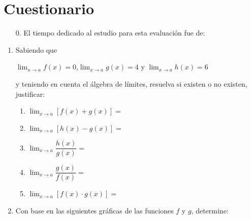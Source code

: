 \documentclass[letterpaper,fleqn]{article}
\let\ds\displaystyle
\begin{document}
 \section*{Cuestionario}
 \begin{enumerate}
 \item[0.] El tiempo dedicado al estudio para esta evaluación fue de: \hrulefill
 \end{enumerate}
\begin{enumerate}
 \item Sabiendo que
\begin{center}
$\ds{\lim_{x\rightarrow a}f(x)=0}$,\quad  $\ds{\lim_{x\rightarrow a}g(x)=4}$ \quad y \quad $\ds{\lim_{x\rightarrow a}h(x)=6}$ 
\end{center}
y teniendo en cuenta el álgebra de límites, resuelva si existen o no existen, justificar:
      \begin{enumerate}
	 \item $\ds{\lim_{x\rightarrow a}[f(x)+g(x)]}=$
	 \item $\ds{\lim_{x\rightarrow a}[h(x)-g(x)]}=$
	 \item $\ds{\lim_{x\rightarrow a}\dfrac{h(x)}{g(x)}}=$
	 \item $\ds{\lim_{x\rightarrow a}\dfrac{g(x)}{f(x)}}=$
	 \item $\ds{\lim_{x\rightarrow a}[f(x)\cdot g(x)]}=$
      \end{enumerate}
   \item Con base en las siguientes gráficas de las funciones $f$ y $g$, determine:


\end{enumerate}
\end{document}
